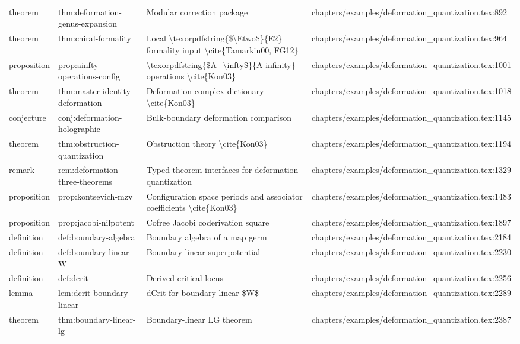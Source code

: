 \documentclass[11pt]{article}
\begin{document}
\begin{longtable}{L{0.10\textwidth}L{0.26\textwidth}L{0.42\textwidth}L{0.22\textwidth}}
theorem & thm:deformation-genus-expansion & Modular correction package & chapters/examples/deformation\_quantization.tex:892\\
theorem & thm:chiral-formality & Local \textbackslash{}texorpdfstring\{\$\textbackslash{}Etwo\$\}\{E2\} formality input \textbackslash{}cite\{Tamarkin00, FG12\} & chapters/examples/deformation\_quantization.tex:964\\
proposition & prop:ainfty-operations-config & \textbackslash{}texorpdfstring\{\$A\_\textbackslash{}infty\$\}\{A-infinity\} operations \textbackslash{}cite\{Kon03\} & chapters/examples/deformation\_quantization.tex:1001\\
theorem & thm:master-identity-deformation & Deformation-complex dictionary \textbackslash{}cite\{Kon03\} & chapters/examples/deformation\_quantization.tex:1018\\
conjecture & conj:deformation-holographic & Bulk-boundary deformation comparison & chapters/examples/deformation\_quantization.tex:1145\\
theorem & thm:obstruction-quantization & Obstruction theory \textbackslash{}cite\{Kon03\} & chapters/examples/deformation\_quantization.tex:1194\\
remark & rem:deformation-three-theorems & Typed theorem interfaces for deformation quantization & chapters/examples/deformation\_quantization.tex:1329\\
proposition & prop:kontsevich-mzv & Configuration space periods and associator coefficients \textbackslash{}cite\{Kon03\} & chapters/examples/deformation\_quantization.tex:1483\\
proposition & prop:jacobi-nilpotent & Cofree Jacobi coderivation square & chapters/examples/deformation\_quantization.tex:1897\\
definition & def:boundary-algebra & Boundary algebra of a map germ & chapters/examples/deformation\_quantization.tex:2184\\
definition & def:boundary-linear-W & Boundary-linear superpotential & chapters/examples/deformation\_quantization.tex:2230\\
definition & def:dcrit & Derived critical locus & chapters/examples/deformation\_quantization.tex:2256\\
lemma & lem:dcrit-boundary-linear & dCrit for boundary-linear \$W\$ & chapters/examples/deformation\_quantization.tex:2289\\
theorem & thm:boundary-linear-lg & Boundary-linear LG theorem & chapters/examples/deformation\_quantization.tex:2387\\

\end{longtable}
\end{document}
